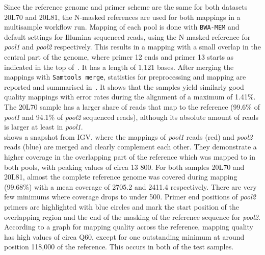 Since the reference genome and primer scheme are the same for both datasets 20L70 and 20L81, the N-masked references are used for both mappings in a multisample workflow run. Mapping of each pool is done with \texttt{BWA-MEM} and default settings for Illumina-sequenced reads, using the N-masked reference for \textit{pool1} and \textit{pool2} respectively. This results in a mapping with a small overlap in the central part of the genome, where primer 12 ends and primer 13 starts as indicated in the top of~. It has a length of 1,121 bases. After merging the mappings with \texttt{Samtools merge}, statistics for preprocessing and mapping are reported and summarised in~. It shows that the samples yield similarly good quality mappings with error rates during the alignment of a maximum of 1.41\%. The 20L70 sample has a larger share of reads that map to the reference (99.6\% of \textit{pool1} and 94.1\% of \textit{pool2} sequenced reads), although its absolute amount of reads is larger at least in \textit{pool1}.\\
 shows a snapshot from \ac{IGV}, where the mappings of \textit{pool1} reads (red) and \textit{pool2} reads (blue) are merged and clearly complement each other. They demonstrate a higher coverage in the overlapping part of the reference which was mapped to in both pools, with peaking values of circa {13 800\texttimes }. For both samples 20L70 and 20L81, almost the complete reference genome was covered during mapping (99.68\%) with a mean coverage of {2705.2\texttimes } and {2411.4\texttimes } respectively. There are very few minimums where coverage drops to under {500\texttimes }. Primer end positions of \textit{pool2} primers are highlighted with blue circles and mark the start position of the overlapping region and the end of the masking of the reference sequence for \textit{pool2}. According to a graph for mapping quality across the reference, mapping quality has high values of circa Q60, except for one outstanding minimum at around position 118,000 of the reference. This occurs in both of the test samples.\\
